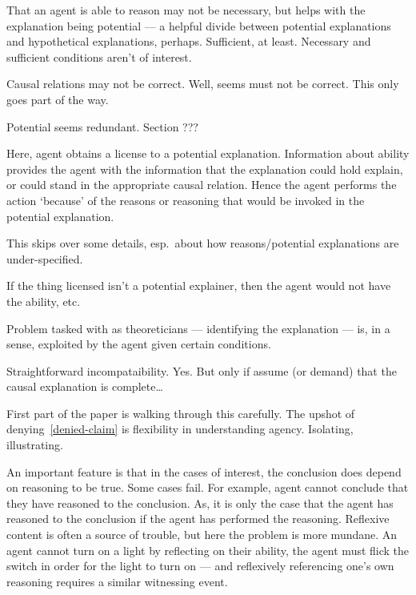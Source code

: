 \documentclass[10pt]{article}
\newcommand{\hozlinedash}[0]{%
  \noindent\hdashrule[0.5ex][c]{\textwidth}{.1pt}{2.5pt}
}
\begin{document}
\hozlinedash





That an agent is able to reason may not be necessary, but helps with the explanation being potential --- a helpful divide between potential explanations and hypothetical explanations, perhaps.
Sufficient, at least.
Necessary and sufficient conditions aren't of interest.


Causal relations may not be correct.
Well, seems must not be correct.
This only goes part of the way.

Potential seems redundant.
Section ???

Here, agent obtains a license to a potential explanation.
Information about ability provides the agent with the information that the explanation could hold explain, or could stand in the appropriate causal relation.
Hence the agent performs the action `because' of the reasons or reasoning that would be invoked in the potential explanation.

{
\color{red} This skips over some details, esp.\ about how reasons/potential explanations are under-specified.
}

If the thing licensed isn't a potential explainer, then the agent would not have the ability, etc.\

Problem tasked with as theoreticians --- identifying the explanation --- is, in a sense, exploited by the agent given certain conditions.

Straightforward incompataibility.
Yes.
But only if assume (or demand) that the causal explanation is complete\dots




{
  \color{red}
  First part of the paper is walking through this carefully.
}
The upshot of denying~\ref{denied-claim} is flexibility in understanding agency.
Isolating, illustrating.



An important feature is that in the cases of interest, the conclusion does depend on reasoning to be true.
Some cases fail.
For example, agent cannot conclude that they have reasoned to the conclusion.
As, it is only the case that the agent has reasoned to the conclusion if the agent has performed the reasoning.
Reflexive content is often a source of trouble, but here the problem is more mundane.
An agent cannot turn on a light by reflecting on their ability, the agent must flick the switch in order for the light to turn on --- and reflexively referencing one's own reasoning requires a similar witnessing event.
\end{document}
